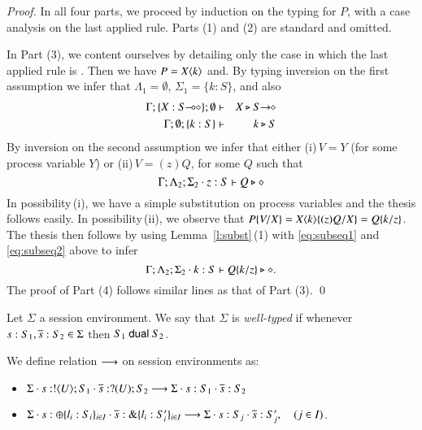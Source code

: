 \begin{proof}
In all four parts, we proceed by induction on the typing for $P$, with a case analysis on the last applied rule. 
Parts (1) and (2) are standard and omitted. 

In Part (3), we content ourselves by detailing only the case in which the last applied rule is . 
Then we have $P = X\langle k \rangle$ and. By typing inversion on the first assumption we infer that $\Lambda_1 = \emptyset$, $\Sigma_1 = \{k : S\}$, and also 
\begin{eqnarray}
\Gamma; \{X : \lhot{S} \} ; \emptyset & \proves &  X \hastype \shot{S} \nonumber \\
\Gamma; \emptyset; \{k : S\} & \proves & k \hastype S  \label{eq:subseq1}
\end{eqnarray}
By inversion on the second assumption we infer that either (i)\,$V = Y$ (for some process variable $Y$) or (ii)\,$V = (z)Q$, for some $Q$ such that
\begin{equation}
\Gamma; \Lambda_2 ; \Sigma_2 \cdot z:S  \vdash   Q \triangleright \diamond \label{eq:subseq2}\\
\end{equation}
In possibility\,(i), we have a simple substitution on process variables and the thesis follows easily. 
In possibility\,(ii), we observe that $P\{V/X \} = X\langle k \rangle\{(z)Q/X \} = Q\{k/z \}$.
The thesis then follows by using Lemma~\ref{l:subst}\,(1) with \eqref{eq:subseq1} and \eqref{eq:subseq2} above to infer 
\begin{equation*}
\Gamma; \Lambda_2 ; \Sigma_2 \cdot k:S  \vdash   Q\{k/z \} \triangleright \diamond .
\end{equation*}
The proof of Part (4) follows similar lines as that of Part (3).
\qed
\end{proof}

\begin{definition}
	Let $\Sigma$ a session environment.
	We say that $\Sigma$ is {\em well-typed} if whenever
	$s: S_1, \overline{s}: S_2 \in \Sigma$ then $S_1 \ \mathsf{dual}\  S_2$.
\end{definition}

\begin{definition}
	We define relation $\longrightarrow$ on session environments as:
	\begin{itemize}
		\item	$\Sigma \cdot s: ! \langle U \rangle ; S_1 \cdot \overline{s}: ? (U) ; S_2 \longrightarrow \Sigma \cdot s: S_1 \cdot \overline{s}: S_2$
		\item	$\Sigma \cdot s: \oplus \{l_i: S_i\}_{i \in I} \cdot \overline{s}: \& \{l_i: S_i'\}_{i \in I} \longrightarrow \Sigma \cdot s: S_j \cdot \overline{s}: S_j', \quad (j \in I)$.
	\end{itemize}
\end{definition}

